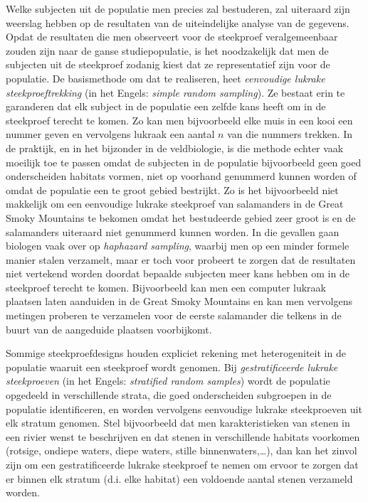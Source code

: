 \documentclass[
  12pt,dutch]{book}
\theoremstyle{definition}
\theoremstyle{definition}
\theoremstyle{definition}
\theoremstyle{definition}
\theoremstyle{remark}
\begin{document}
Welke subjecten uit de populatie men precies zal bestuderen, zal uiteraard zijn weerslag hebben op de resultaten van de uiteindelijke analyse van de gegevens. Opdat de resultaten die men observeert voor de steekproef veralgemeenbaar zouden zijn naar de ganse studiepopulatie, is het noodzakelijk dat men de subjecten uit de steekproef zodanig kiest dat ze representatief zijn voor de populatie. De basismethode om dat te realiseren, heet \emph{eenvoudige lukrake steekproeftrekking} (in het Engels: \emph{simple random sampling}). Ze bestaat erin te garanderen dat elk subject in de populatie een zelfde kans heeft om in de steekproef terecht te komen. Zo kan men bijvoorbeeld elke muis in een kooi een nummer geven en vervolgens lukraak een aantal \(n\) van die nummers trekken. In de praktijk, en in het bijzonder in de veldbiologie, is die methode echter vaak moeilijk toe te passen omdat de subjecten in de populatie bijvoorbeeld geen goed onderscheiden habitats vormen, niet op voorhand genummerd kunnen worden of omdat de populatie een te groot gebied bestrijkt. Zo is het bijvoorbeeld niet makkelijk om een eenvoudige lukrake steekproef van salamanders in de Great Smoky Mountains te bekomen omdat het bestudeerde gebied zeer groot is en de salamanders uiteraard niet genummerd kunnen worden. In die gevallen gaan biologen vaak over op \emph{haphazard sampling}, waarbij men op een minder formele manier stalen verzamelt, maar er toch voor probeert te zorgen dat de resultaten niet vertekend worden doordat bepaalde subjecten meer kans hebben om in de steekproef terecht te komen. Bijvoorbeeld kan men een computer lukraak plaatsen laten aanduiden in de Great Smoky Mountains en kan men vervolgens metingen proberen te verzamelen voor de eerste salamander die telkens in de buurt van de aangeduide plaatsen voorbijkomt.

Sommige steekproefdesigns houden expliciet rekening met heterogeniteit in de populatie waaruit een steekproef wordt genomen. Bij \emph{gestratificeerde lukrake steekproeven} (in het Engels: \emph{stratified random samples}) wordt de populatie opgedeeld in verschillende strata, die goed onderscheiden subgroepen in de populatie identificeren, en worden vervolgens eenvoudige lukrake steekproeven uit elk stratum genomen. Stel bijvoorbeeld dat men karakteristieken van stenen in een rivier wenst te beschrijven en dat stenen in verschillende habitats voorkomen (rotsige, ondiepe waters, diepe waters, stille binnenwaters,\ldots), dan kan het zinvol zijn om een gestratificeerde lukrake steekproef te nemen om ervoor te zorgen dat er binnen elk stratum (d.i. elke habitat) een voldoende aantal stenen verzameld worden.
\end{document}
